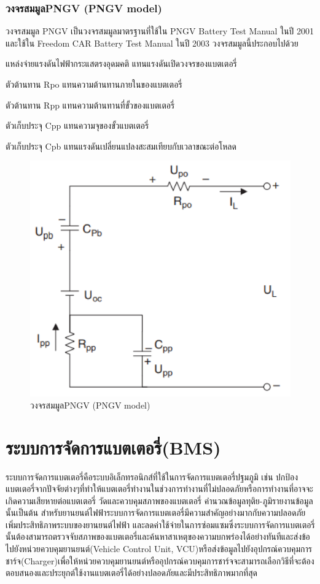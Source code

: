 \subsubsection*{วงจรสมมูลPNGV (PNGV model)}
วงจรสมมูล PNGV เป็นวงจรสมมูลมาตรฐานที่ใช้ใน PNGV Battery Test Manual ในปี 2001 และใช้ใน Freedom CAR Battery Test Manual
 ในปี 2003 วงจรสมมูลนี้ประกอบไปด้วย
\begin{itemize}
	{\item 	แหล่งจ่ายแรงดันไฟฟ้ากระแสตรงอุดมคติ แทนแรงดันเปิดวงจรของแบตเตอรี่}
	{\item 	ตัวต้านทาน Rpo แทนความต้านทานภายในของแบตเตอรี่}
	{\item 	ตัวต้านทาน Rpp แทนความต้านทานที่ขั้วของแบตเตอรี่}
	{\item 	ตัวเก็บประจุ Cpp แทนความจุของขั้วแบตเตอรี่}
	{\item 	ตัวเก็บประจุ Cpb แทนแรงดันเปลี่ยนแปลงสะสมเทียบกับเวลาขณะต่อโหลด}
\end{itemize}
\begin{center}
	\begin{figure}[H]
		\includegraphics[width=0.6\linewidth]{Chapters/img/PNGV_model.png}
			\centering
			\captionsetup{justification=centering,margin=2cm}
			\caption{วงจรสมมูลPNGV (PNGV model)}
	\end{figure}
\end{center}
\section{ระบบการจัดการแบตเตอรี่(BMS)}
ระบบการจัดการแบตเตอรี่คือระบบอิเล็กทรอนิกส์ที่ใช้ในการจัดการแบตเตอรี่ปฐมภูมิ เช่น ปกป้องแบตเตอรี่จากปัจจัยต่างๆที่ทำให้แบตเตอรี่ทำงานในช่วงการทำงานที่ไม่ปลอดภัยหรือการทำงานที่อาจจะเกิดความเสียหายต่อแบตเตอรี่ 
วัดและควบคุมสภาพของแบตเตอรี่ คำนวณข้อมูลทุติย-ภูมิรายงานข้อมูลนั้นเป็นต้น
สำหรับยานยนต์ไฟฟ้าระบบการจัดการแบตเตอรี่มีความสำคัญอย่างมากกับความปลอดภัย เพิ่มประสิทธิภาพระบบของยานยนต์ไฟฟ้า และลดค่าใช้จ่ายในการซ่อมแซมซึ่งระบบการจัดการแบตเตอรี่นั้นต้องสามารถตรวจจับสภาพของแบตเตอรี่และค้นหาสาเหตุของความบกพร่องได้อย่างทันทีและส่งข้อไปยังหน่วยควบคุมยานยนต์(Vehicle Control Unit, VCU)หรือส่งข้อมูลไปยังอุปกรณ์ควบคุมการชาร์จ(Charger)เพื่อให้หน่วยควบคุมยานยนต์หรืออุปกรณ์ควบคุมการชาร์จจะสามารถเลือกวิธีที่จะต้องตอบสนองและประยุกต์ใช้งานแบตเตอรี่ได้อย่างปลอดภัยและมีประสิทธิภาพมากที่สุด
